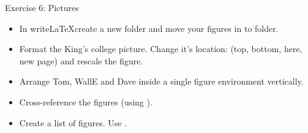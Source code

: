 \documentclass[10pt,times]{beamer}
\begin{document}
\begin{frame}[fragile]{Exercise 6: Pictures}

\begin{center}
\end{center}

\begin{itemize}
\item In write\LaTeX create a new folder  and move your figures in to  folder.
\item Format the King's college picture. Change it's location: (top, 
bottom, here, new page) and rescale the figure.
\item Arrange Tom, WallE and Dave inside a single figure environment 
vertically.
\item Cross-reference the figures (using ).
\item Create a list of figures. Use .
\end{itemize}

\begin{center}
%
\end{center}

\end{frame}


\end{document}
